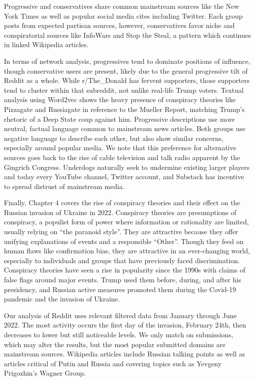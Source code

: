 \documentclass[doublespacing]{utdthesis}
\begin{document}
Progressive and conservatives share common mainstream sources like the New York Times as well as popular social media cites including Twitter.
Each group posts from expected partisan sources, however, conservatives favor niche and conspiratorial sources like InfoWars and Stop the Steal, a pattern which continues in linked Wikipedia articles.

In terms of network analysis, progressives tend to dominate positions of influence, though conservative users are present, likely due to the general progressive tilt of Reddit as a whole.
While r/The\_Donald has fervent supporters, those supporters tend to cluster within that subreddit, not unlike real-life Trump voters.
Textual analysis using Word2vec shows the heavy presence of conspiracy theories like Pizzagate and Russiagate in reference to the Mueller Report, matching Trump's rhetoric of a Deep State coup against him.
Progressive descriptions use more neutral, factual language common to mainstream news articles.
Both groups use negative language to describe each other, but also show similar concerns, especially around popular media.
We note that this preference for alternative sources goes back to the rise of cable television and talk radio apparent by the Gingrich Congress.
Underdogs naturally seek to undermine existing larger players and today every YouTube channel, Twitter account, and Substack has incentive to spread distrust of mainstream media.
 
Finally, Chapter 4 covers the rise of conspiracy theories and their effect on the Russian invasion of Ukraine in 2022.
Conspiracy theories are presumptions of conspiracy, a populist form of power where information or rationality are limited, usually relying on ``the paranoid style''.
They are attractive because they offer unifying explanations of events and a  responsible ``Other''.
Though they feed on human flaws like confirmation bias, they are attractive in an ever-changing world, especially to individuals and groups that have previously faced discrimination.
Conspiracy theories have seen a rise in popularity since the 1990s with claims of false flags around major events.
Trump used them before, during, and after his presidency, and Russian active measures promoted them during the Covid-19 pandemic and the invasion of Ukraine.
 
Our analysis of Reddit uses relevant filtered data from January through June 2022. 
The most activity occurs the first day of the invasion, February 24th, then decreases to lower but still noticeable levels.
We only match on submissions, which may alter the results, but the most popular submitted domains are mainstream sources.
Wikipedia articles include Russian talking points as well as articles critical of Putin and Russia and covering topics such as Yevgeny Prigozhin's Wagner Group.
\end{document}
